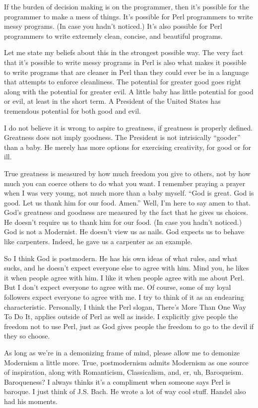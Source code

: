 \documentclass[10pt,letterpaper]{article}
\begin{document}
If the burden of decision making is on the programmer, then it's possible for
the programmer to make a mess of things. It's possible for Perl programmers
to write messy programs. (In case you hadn't noticed.) It's also possible for
Perl programmers to write extremely clean, concise, and beautiful programs.

Let me state my beliefs about this in the strongest possible way. The very
fact that it's possible to write messy programs in Perl is also what makes it
possible to write programs that are cleaner in Perl than they could ever be
in a language that attempts to enforce cleanliness. The potential for greater
good goes right along with the potential for greater evil. A little baby has
little potential for good or evil, at least in the short term. A President of
the United States has tremendous potential for both good and evil.

I do not believe it is wrong to aspire to greatness, if greatness is properly
defined. Greatness does not imply goodness. The President is not intrisically
``gooder'' than a baby. He merely has more options for exercising
creativity, for good or for ill.

True greatness is measured by how much freedom you give to others, not by how
much you can coerce others to do what you want. I remember praying a prayer
when I was very young, not much more than a baby myself. ``God is great. God
is good. Let us thank him for our food. Amen.'' Well, I'm here to say amen
to that. God's greatness and goodness are measured by the fact that he gives
us choices. He doesn't require us to thank him for our food. (In case you
hadn't noticed.) God is not a Modernist. He doesn't view us as nails. God
expects us to behave like carpenters. Indeed, he gave us a carpenter as an
example.

So I think God is postmodern. He has his own ideas of what rules, and what
sucks, and he doesn't expect everyone else to agree with him. Mind you, he
likes it when people agree with him. I like it when people agree with me
about Perl. But I don't expect everyone to agree with me. Of course, some of
my loyal followers expect everyone to agree with me. I try to think of it as
an endearing characteristic. Personally, I think the Perl slogan, There's
More Than One Way To Do It, applies outside of Perl as well as inside. I
explicitly give people the freedom not to use Perl, just as God gives people
the freedom to go to the devil if they so choose.

As long as we're in a demonizing frame of mind, please allow me to demonize
Modernism a little more. True, postmodernism admits Modernism as one source
of inspiration, along with Romanticism, Classicalism, and, er, uh,
Baroqueism. Baroqueness? I always thinks it's a compliment when someone says
Perl is baroque. I just think of J.S. Bach. He wrote a lot of way cool stuff.
Handel also had his moments.
\end{document}
